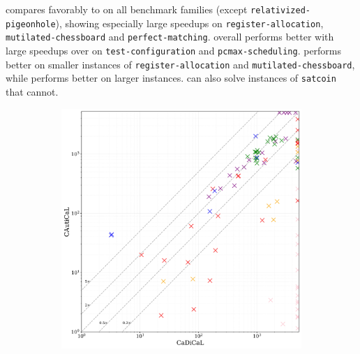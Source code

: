 \tool compares favorably to \cadical on all benchmark families (except
\texttt{relativized-pigeonhole}), showing especially large speedups on
\texttt{register-allocation}, \texttt{mutilated-chessboard} and
\texttt{perfect-matching}. \prelearn overall performs better with large speedups
over \tool on \texttt{test-configuration} and \texttt{pcmax-scheduling}. \tool
performs better on smaller instances of \texttt{register-allocation} and
\texttt{mutilated-chessboard}, while \prelearn performs better on larger
instances. \tool can also solve instances of \texttt{satcoin} that
\prelearn cannot.


\begin{figure}[!t]
    \centering
    \begin{subfigure}[t]{0.45\textwidth}
            \centering
            \includegraphics[width=\textwidth]{figs/cadical_vs_cautical_interesting.jpg}
            \label{fig:cautical-vs-cadical}
    \end{subfigure}

\end{figure}
